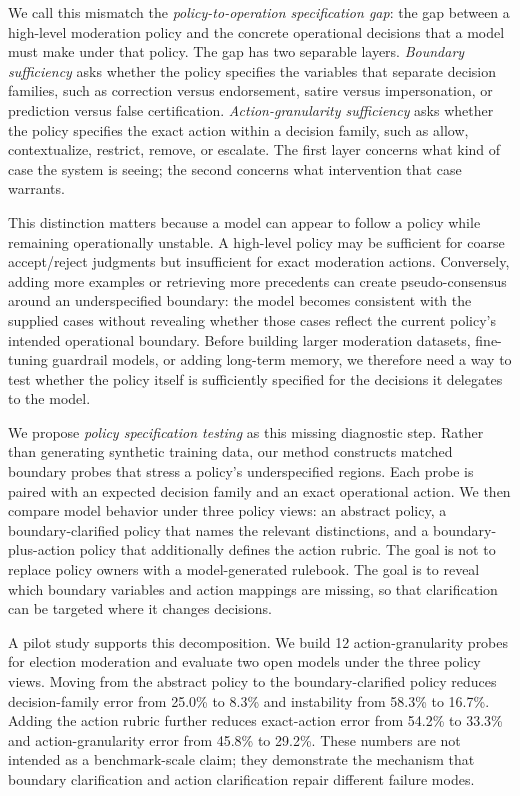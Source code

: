 \documentclass{article} %
\begin{document}
We call this mismatch the \emph{policy-to-operation specification gap}: the gap
between a high-level moderation policy and the concrete operational decisions
that a model must make under that policy. The gap has two separable layers.
\emph{Boundary sufficiency} asks whether the policy specifies the variables that
separate decision families, such as correction versus endorsement, satire versus
impersonation, or prediction versus false certification. \emph{Action-granularity
sufficiency} asks whether the policy specifies the exact action within a
decision family, such as allow, contextualize, restrict, remove, or escalate.
The first layer concerns what kind of case the system is seeing; the second
concerns what intervention that case warrants.

This distinction matters because a model can appear to follow a policy while
remaining operationally unstable. A high-level policy may be sufficient for
coarse accept/reject judgments but insufficient for exact moderation actions.
Conversely, adding more examples or retrieving more precedents can create
pseudo-consensus around an underspecified boundary: the model becomes consistent
with the supplied cases without revealing whether those cases reflect the
current policy's intended operational boundary. Before building larger
moderation datasets, fine-tuning guardrail models, or adding long-term memory,
we therefore need a way to test whether the policy itself is sufficiently
specified for the decisions it delegates to the model.

We propose \emph{policy specification testing} as this missing diagnostic step.
Rather than generating synthetic training data, our method constructs matched
boundary probes that stress a policy's underspecified regions. Each probe is
paired with an expected decision family and an exact operational action. We then
compare model behavior under three policy views: an abstract policy, a
boundary-clarified policy that names the relevant distinctions, and a
boundary-plus-action policy that additionally defines the action rubric. The
goal is not to replace policy owners with a model-generated rulebook. The goal
is to reveal which boundary variables and action mappings are missing, so that
clarification can be targeted where it changes decisions.

A pilot study supports this decomposition. We build 12 action-granularity probes
for election moderation and evaluate two open models under the three policy
views. Moving from the abstract policy to the boundary-clarified policy reduces
decision-family error from 25.0\% to 8.3\% and instability from 58.3\% to
16.7\%. Adding the action rubric further reduces exact-action error from 54.2\%
to 33.3\% and action-granularity error from 45.8\% to 29.2\%. These numbers are
not intended as a benchmark-scale claim; they demonstrate the mechanism that
boundary clarification and action clarification repair different failure modes.
\end{document}
